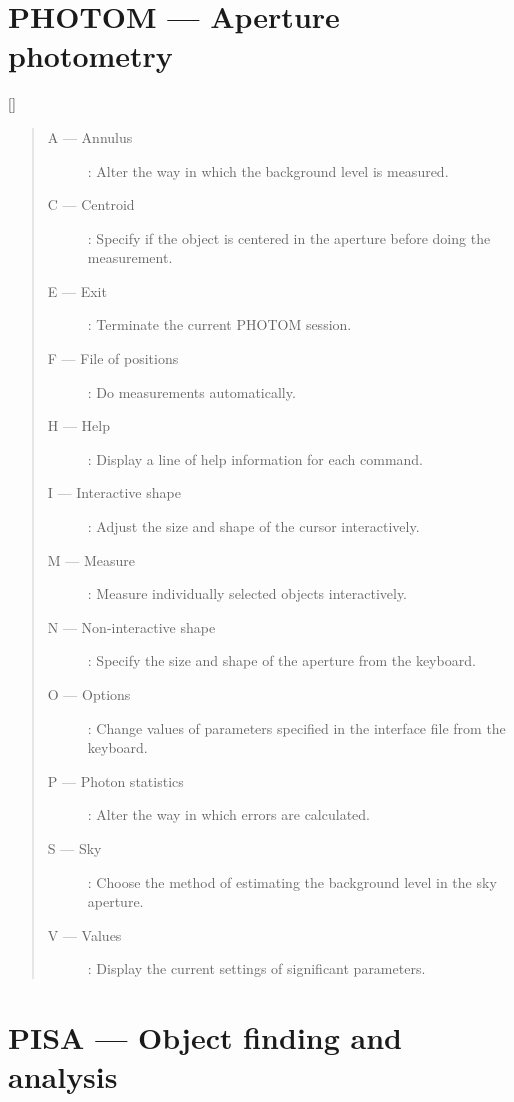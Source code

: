 \newpage

\section{PHOTOM --- Aperture photometry}

\vspace{-10mm}

\hfill []

\vspace{2mm}

\begin{quote}
\begin{description}
\item [A --- Annulus] :
 Alter the way in which the background level is measured.
\item [C --- Centroid] :
 Specify if the object is centered in the aperture before doing the measurement.
\item [E --- Exit] :
 Terminate the current PHOTOM session.
\item [F --- File of positions] :
 Do measurements automatically.
\item [H --- Help] :
 Display a line of help information for each command.
\item [I --- Interactive shape] :
 Adjust the size and shape of the cursor interactively.
\item [M --- Measure] :
 Measure individually selected objects interactively.
\item [N --- Non-interactive shape] :
 Specify the size and shape of the aperture from the keyboard.
\item [O --- Options] :
 Change values of parameters specified in the interface file from the keyboard.
\item [P --- Photon statistics] :
 Alter the way in which errors are calculated.
\item [S --- Sky] :
 Choose the method of estimating the background level in the sky aperture.
\item [V --- Values] :
 Display the current settings of significant parameters.
\end{description}
\end{quote}

\newpage

\section{PISA --- Object finding and analysis}

